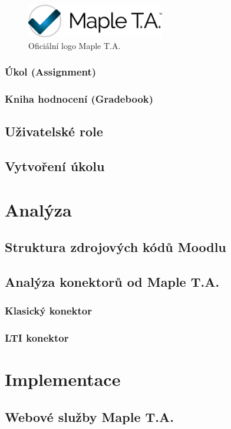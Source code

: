 \documentclass[
print,
  11pt,
  table,   
  nolof,    
  nolot,
  oneside,
  final
]{fithesis3}
\begin{document}
		\begin{figure}
		  \begin{center}
		    \includegraphics[width=60mm]{images/MapleTA_logo.jpg}
		   \end{center}
		  \caption{Oficiální logo Maple T.A.  \cite{maple-logo}}
		  \label{fig:maplelogo}
		\end{figure}

		\subsection{Úkol (Assignment)}
		\subsection{Kniha hodnocení (Gradebook)}
	\section{Uživatelské role}
	\section{Vytvoření úkolu}
\chapter{Analýza}
	\section{Struktura zdrojových kódů Moodlu}
	\section{Analýza konektorů od Maple T.A.}
		\subsection{Klasický konektor}
		\subsection{LTI konektor}

\chapter{Implementace}
	\section{Webové služby Maple T.A.}
\end{document}
